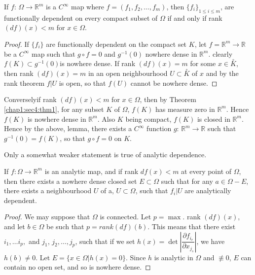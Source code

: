 \begin{theorem}\label{chap1:sec4:thm2}%
  If $f$: $\Omega \to \mathbb{R}^m$ is a $C^\infty$ map where $f  =
  (f_1, f_2, \ldots, f_m)$, then $\{f_i\}_{ 1 \leq i \leq m}$, are
  functionally dependent on every compact subset of $\Omega$ if and
  only if rank $(df)(x) < m$ for $x \in \Omega$. 
\end{theorem}

\begin{proof}%
  If $\{f_i\}$ are functionally dependent on the compact set $K$, let
  $f =\mathbb{R}^m \to \mathbb{R}$ be a $C^\infty$ map such that $g \circ
  f = 0$ and $g^{-1} (0)$ nowhere dense in $\mathbb{R}^m$. clearly
  $f(K) \subset  g^{-1}(0)$is nowhere dense. If rank $(df)(x) = m$ for some
    $x \in \overset{\circ}{K}$, then rank $(df) (x) = m$ in an open
  neighbourhood $U 
    \subset \overset{\circ}{K}$ of $x$ and by the rank theorem $f |U$
    is open, so that $f(U)$ cannot be nowhere dense.  
\end{proof}

Conversely\pageoriginale if rank $(df) (x) < m$ for $x \in \Omega$,
then by Theorem \ref{chap1:sec4:thm1}, for any subset $K$ of $\Omega$, $f(K)$ has measure zero in
$\mathbb{R}^m$. Hence $f(K)$ is nowhere dense in $\mathbb{R}^m$. Also 
$K$ being compact, 
$f(K)$ is closed in $\mathbb{R}^m$. Hence by the above, lemma, there
exists a $C^\infty$ function $g$: $\mathbb{R}^m \to \mathbb{R} $ such
that $g^{-1} (0) = f (K)$, so that $g \circ f = 0 $ on $K$.  

Only a somewhat weaker statement is true of analytic dependence.

\begin{theorem*}[{\boldmath $2'$}]\label{chap1:sec4:thm2'}%
  If $f: \Omega \to \mathbb{R}^m$ is an analytic map, and if rank
  $df (x) < m$ at every point of $\Omega$, then there exists a nowhere
  dense closed set $E \subset \Omega$ such that for any $a \in \Omega
  - E$, there  exists a neighbourhood
  $U$ of a, $U \subset \Omega$, such that $f_i |U$ are analytically
  dependent. 
\end{theorem*}

\begin{proof}
  We may suppose that $\Omega$ is connected. Let $p= \max$. rank
  $(df) (x)$, and let $b \in \Omega$ be such that $p = rank
  (df)(b)$. This means that there exist $i_1, \ldots i_p, $ and $j_1$,
  $j_2, \ldots, j_p$, such that if we set $h(x) = \det |
  \dfrac{\partial f_{i_r}}{\partial x_{j_s}}|$, we have $h(b) \neq 0$. Let $E
  = \{x \in \Omega | h (x) = 0\}$. Since $h$ is analytic in $\Omega$
  and $\nequiv 0$, $E$ can contain no open set, and so is nowhere dense.  
\end{proof}

